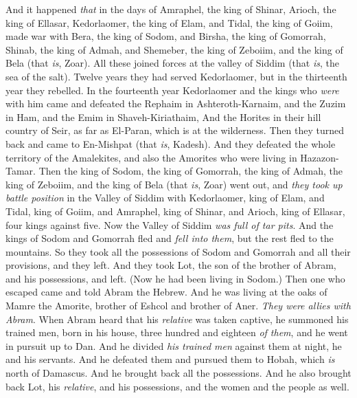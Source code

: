\begin{biblechapter} %
 And it happened \textit{that} in the days of Amraphel, the king of Shinar, Arioch, the king of Ellasar, Kedorlaomer, the king of Elam, and Tidal, the king of Goiim,
\verse made war with Bera, the king of Sodom, and Birsha, the king of Gomorrah, Shinab, the king of Admah, and Shemeber, the king of Zeboiim, and the king of Bela (that \textit{is}, Zoar).
\verse All these joined forces at the valley of Siddim (that \textit{is}, the sea of the salt).
\verse Twelve years they had served Kedorlaomer, but in the thirteenth year they rebelled.
\verse In the fourteenth year Kedorlaomer and the kings who \textit{were} with him came and defeated the Rephaim in Ashteroth-Karnaim, and the Zuzim in Ham, and the Emim in Shaveh-Kiriathaim,
\verse And the Horites in their hill country of Seir, as far as El-Paran, which is at the wilderness.
\verse Then they turned back and came to En-Mishpat (that \textit{is}, Kadesh). And they defeated the whole territory of the Amalekites, and also the Amorites who were living in Hazazon-Tamar.
\verse Then the king of Sodom, the king of Gomorrah, the king of Admah, the king of Zeboiim, and the king of Bela (that \textit{is}, Zoar) went out, and \textit{they took up battle position} in the Valley of Siddim
\verse with Kedorlaomer, king of Elam, and Tidal, king of Goiim, and Amraphel, king of Shinar, and Arioch, king of Ellasar, four kings against five.
\verse Now the Valley of Siddim \textit{was full of tar pits}. And the kings of Sodom and Gomorrah fled and \textit{fell into them}, but the rest fled to the mountains.
\verse So they took all the possessions of Sodom and Gomorrah and all their provisions, and they left.
\verse And they took Lot, the son of the brother of Abram, and his possessions, and left. (Now he had been living in Sodom.)
\verse Then one who escaped came and told Abram the Hebrew. And he was living at the oaks of Mamre the Amorite, brother of Eshcol and brother of Aner. \textit{They were allies with Abram}.
\verse When Abram heard that his \textit{relative} was taken captive, he summoned his trained men, born in his house, three hundred and eighteen \textit{of them}, and he went in pursuit up to Dan.
\verse And he divided \textit{his trained men} against them at night, he and his servants. And he defeated them and pursued them to Hobah, which \textit{is} north of Damascus.
\verse And he brought back all the possessions. And he also brought back Lot, his \textit{relative}, and his possessions, and the women and the people as well.

\end{biblechapter}
